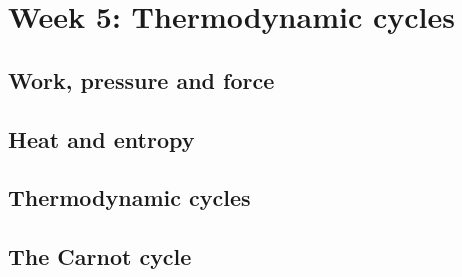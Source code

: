 \renewcommand{\thisweek}{MATH327 Week 5}
\renewcommand{\moddate}{Last modified 24 Feb.~2021}
\setcounter{section}{5}
\setcounter{subsection}{0}
{}
\section*{Week 5: Thermodynamic cycles}

\subsection{Work, pressure and force}



\newpage %
\subsection{Heat and entropy}



\newpage %
\subsection{Thermodynamic cycles}



\newpage %
\subsection{The Carnot cycle}
